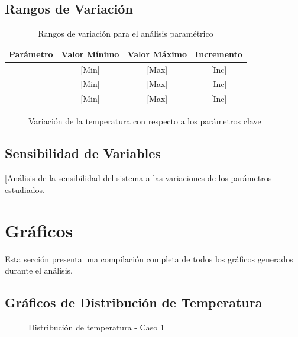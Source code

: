 \documentclass[12pt,letterpaper]{article}
\begin{document}
\subsection{Rangos de Variación}
\begin{table}[H]
    \centering
    \caption{Rangos de variación para el análisis paramétrico}
    \label{tab:rangos_parametrico}
    \begin{tabular}{lccc}
        \toprule
        \textbf{Parámetro} & \textbf{Valor Mínimo} & \textbf{Valor Máximo} & \textbf{Incremento} \\
        \midrule
        [Parámetro 1] & [Min] & [Max] & [Inc] \\
        [Parámetro 2] & [Min] & [Max] & [Inc] \\
        [Parámetro 3] & [Min] & [Max] & [Inc] \\
        \bottomrule
    \end{tabular}
\end{table}

\begin{figure}[H]
    \centering
    \caption{Variación de la temperatura con respecto a los parámetros clave}
    \label{fig:analisis_parametrico}
\end{figure}

\subsection{Sensibilidad de Variables}
[Análisis de la sensibilidad del sistema a las variaciones de los parámetros estudiados.]

\newpage
\section{Gráficos}

Esta sección presenta una compilación completa de todos los gráficos generados durante el análisis.

\subsection{Gráficos de Distribución de Temperatura}
\begin{figure}[H]
    \centering
    \caption{Distribución de temperatura - Caso 1}
    \label{fig:temp_caso1}
\end{figure}
\end{document}
